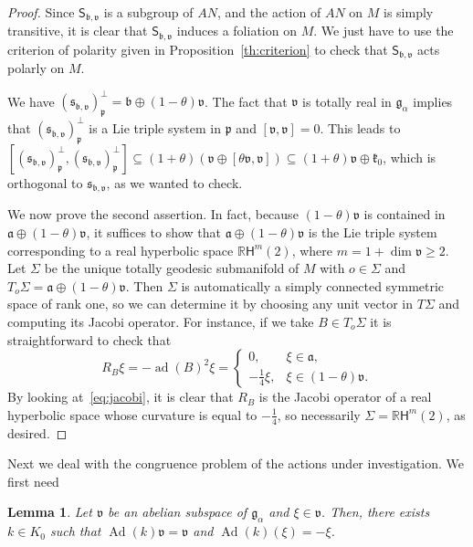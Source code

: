 \documentclass[12pt, a4paper]{amsart}
\newcommand{\g}{\mathfrak}
\newcommand{\s}{\mathsf}
\newcommand{\R}{\mathbb{R}}
\newcommand{\ad}{\operatorname{ad}}
\newcommand{\Ad}{\operatorname{Ad}}
\newtheorem{lemma}[theorem]{Lemma}
\theoremstyle{definition}
\begin{document}
\begin{proof}
Since $\s{S}_{\g{b},\g{v}}$ is a subgroup of $AN$, 
and the action of $AN$ on $M$ is simply transitive,
it is clear that $\s{S}_{\g{b},\g{v}}$ induces a foliation on $M$.
We just have to use the criterion of polarity given in Proposition~\ref{th:criterion} to check that $\s{S}_{\g{b},\g{v}}$ acts polarly on $M$.

We have $(\g{s}_{\g{b},\g{v}})_\g{p}^\perp=\g{b}\oplus(1-\theta)\g{v}$.
The fact that $\g{v}$ is totally real in $\g{g}_\alpha$ implies that 
$(\g{s}_{\g{b},\g{v}})_\g{p}^\perp$ is a Lie triple system in $\g{p}$ and $[\g{v},\g{v}]=0$.
This leads to
$[(\g{s}_{\g{b},\g{v}})_\g{p}^\perp,(\g{s}_{\g{b},\g{v}})_\g{p}^\perp]
\subseteq(1+\theta)(\g{v}\oplus[\theta\g{v},\g{v}])\subseteq(1+\theta)\g{v}\oplus\g{k}_0$, which is orthogonal to $\g{s}_{\g{b},\g{v}}$, as we wanted to check.

We now prove the second assertion.
In fact, because $(1-\theta)\g{v}$ is contained in $\g{a}\oplus (1-\theta)\g{v}$, it suffices to show that $\g{a}\oplus (1-\theta)\g{v}$ is the Lie triple system corresponding to a real hyperbolic space $\R\s{H}^{m}(2)$, where $m=1+\dim \g{v}\geq 2$.
Let $\Sigma$ be the unique totally geodesic submanifold of $M$ with $o\in \Sigma$ and $T_{o}\Sigma=\g{a}\oplus(1-\theta)\g{v}$.
Then $\Sigma$ is automatically a simply connected symmetric space of rank one,
so we can determine it by choosing any unit vector in $T\Sigma$ and computing its Jacobi operator.
For instance, if we take $B\in T_{o}\Sigma$ it is straightforward to check that
\begin{equation*}
R_{B}\xi
=
-\ad(B)^2\xi
=
\begin{cases}
    0, & \xi\in \g{a}, \\
    -\frac{1}{4}\xi, & \xi\in(1-\theta)\g{v}.
\end{cases}
\end{equation*}
By looking at~\eqref{eq:jacobi}, it is clear that $R_B$ is the Jacobi operator of a real hyperbolic space whose curvature is equal to $-\frac{1}{4}$, so necessarily $\Sigma=\R\s{H}^{m}(2)$, as desired.
\end{proof}

Next we deal with the congruence problem of the actions under investigation. 
We first need

\begin{lemma}\label{lemma:action-on-abelian}
Let $\g{v}$ be an abelian subspace of $\g{g}_\alpha$ and $\xi\in\g{v}$.
Then, there exists $k\in K_0$ such that $\Ad(k)\g{v}=\g{v}$ and $\Ad(k)(\xi)=-\xi$.
\end{lemma}
\end{document}
